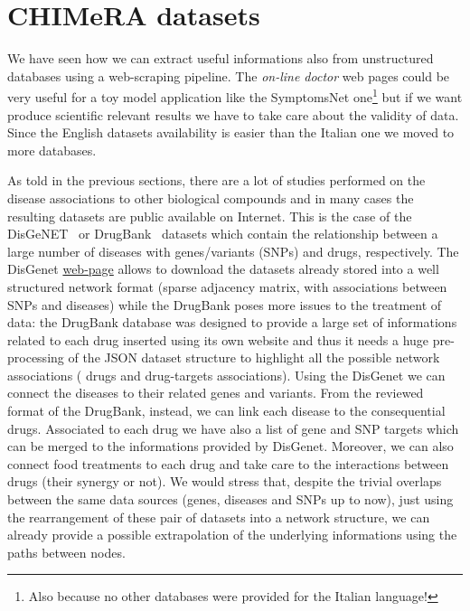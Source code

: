 \documentclass{standalone}
\begin{document}
\section[Dataset]{CHIMeRA datasets}\label{chimera:net}

We have seen how we can extract useful informations also from unstructured databases using a web-scraping pipeline.
The \emph{on-line doctor} web pages could be very useful for a toy model application like the \textsf{SymptomsNet} one\footnote{
  Also because no other databases were provided for the Italian language!
} but if we want produce scientific relevant results we have to take care about the validity of data.
Since the English datasets availability is easier than the Italian one we moved to more  databases.

As told in the previous sections, there are a lot of studies performed on the disease associations to other biological compounds and in many cases the resulting datasets are public available on Internet.
This is the case of the DisGeNET~\cite{DisGeNet} or DrugBank~\cite{DrugBank} datasets which contain the relationship between a large number of diseases with genes/variants (SNPs) and drugs, respectively.
The DisGenet \href{https://doi.org/10.1093/nar/gkw943}{web-page} allows to download the datasets already stored into a well structured network format (sparse adjacency matrix, with  associations between  SNPs and  diseases) while the DrugBank poses more issues to the treatment of data: the DrugBank database was designed to provide a large set of informations related to each drug inserted using its own website and thus it needs a huge pre-processing of the JSON dataset structure to highlight all the possible network associations ( drugs and  drug-targets associations).
Using the DisGenet we can connect the diseases to their related genes and variants.
From the reviewed format of the DrugBank, instead, we can link each disease to the consequential drugs.
Associated to each drug we have also a list of gene and SNP targets which can be merged to the informations provided by DisGenet.
Moreover, we can also connect food treatments to each drug and take care to the interactions between drugs (their synergy or not).
We would stress that, despite the trivial overlaps between the same data sources (genes, diseases and SNPs up to now), just using the rearrangement of these pair of datasets into a network structure, we can already provide a possible extrapolation of the underlying informations using the paths between nodes.
\end{document}
